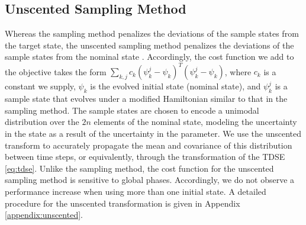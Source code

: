 \documentclass[
  amsfonts,
  amsmath,
  amssymb,
  pra,
  twocolumn,
  superscriptaddress,
]{revtex4-2}
\begin{document}
\subsection{Unscented Sampling Method}
Whereas the sampling method penalizes the deviations of the sample states
from the target state, the unscented sampling method
penalizes the deviations of the sample states from the nominal state
\cite{howell2020direct, lee2013sigma,
  thangavel2020robust}. Accordingly, the cost function we add
to the objective takes the form
$\sum_{k, j} c_{k} (\psi^{j}_{k} - \psi_{k})^{T}
(\psi^{j}_{k} - \psi_{k})$, where $c_{k}$ is a
constant we supply, $\psi_{k}$ is
the evolved initial state (nominal state), and $\psi^{j}_{k}$ is a sample state
that evolves under a modified Hamiltonian similar to that in the sampling method.
The sample states are chosen to encode a unimodal distribution over
the $2n$ elements of the nominal state, modeling the uncertainty in the state
as a result of the uncertainty in the parameter. We use the unscented transform
\cite{julier2004unscented, uhlmann1995dynamic}
to accurately propagate the mean and covariance of this distribution between
time steps, or equivalently, through the transformation of the TDSE \eqref{eq:tdse}.
Unlike the sampling method, the cost function for the unscented sampling method
is sensitive to global phases. Accordingly, we
do not observe a performance increase when
using more than one initial state. 
A detailed procedure for the unscented transformation is given
in Appendix \ref{appendix:unscented}.
\end{document}
